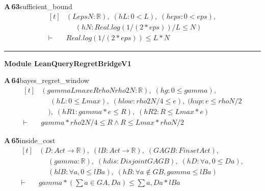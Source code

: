\documentclass[conference]{IEEEtran}
\theoremstyle{definition}
\newcommand{\lean}[1]{\textsf{\footnotesize #1}}
\begin{document}
\noindent\textbf{A\,63}\quad\lean{sufficient\_bound}
{\footnotesize\[ \begin{aligned}[t]
&(\mathit{L} \mathit{eps} \mathit{N} : \mathbb{R} ),\; (\mathit{hL} : 0 < \mathit{L}),\; (\mathit{heps} : 0 < \mathit{eps}),\\
&\quad \; (\mathit{hN} : \mathit{Real}.\mathit{log} (1/(2*\mathit{eps}))/\mathit{L} \leq \mathit{N})\\
\vdash\;&\mathit{Real}.\mathit{log} (1/(2*\mathit{eps})) \leq \mathit{L}*\mathit{N}
\end{aligned} \]}

\vspace{4pt}\noindent\rule{\columnwidth}{0.4pt}\par\vspace{2pt}
\noindent\textbf{Module \lean{LeanQueryRegretBridgeV1}}\par\vspace{3pt}

\noindent\textbf{A\,64}\quad\lean{bayes\_regret\_window}
{\footnotesize\[ \begin{aligned}[t]
&(\mathit{gamma} \mathit{Lmax} \mathit{e} \mathit{R} \mathit{rhoN} \mathit{rho2N} : \mathbb{R} ),\; (\mathit{hg} : 0 \leq \mathit{gamma}),\\
&\quad \; (\mathit{hL} : 0 \leq \mathit{Lmax}),\; (\mathit{hlow} : \mathit{rho2N} / 4 \leq \mathit{e}),\; (\mathit{hup} : \mathit{e} \leq \mathit{rhoN} / 2\\
&\quad ),\; (\mathit{hR1} : \mathit{gamma} * \mathit{e} \leq \mathit{R}),\; (\mathit{hR2} : \mathit{R} \leq \mathit{Lmax} * \mathit{e})\\
\vdash\;&\mathit{gamma} * \mathit{rho2N} / 4 \leq \mathit{R} \wedge \mathit{R} \leq \mathit{Lmax} * \mathit{rhoN} / 2
\end{aligned} \]}

\noindent\textbf{A\,65}\quad\lean{inside\_cost}
{\footnotesize\[ \begin{aligned}[t]
&(\mathit{D} : \mathit{Act} \to \mathbb{R} ),\; (\mathit{lB} : \mathit{Act} \to \mathbb{R} ),\; (\mathit{GA} \mathit{GB} : \mathit{Finset} \mathit{Act}),\\
&\quad \; (\mathit{gamma} : \mathbb{R} ),\; (\mathit{hdis} : \mathit{Disjoint} \mathit{GA} \mathit{GB}),\; (\mathit{hD} : \forall \mathit{a}, 0 \leq \mathit{D} \mathit{a}),\\
&\quad \; (\mathit{hlB} : \forall \mathit{a}, 0 \leq \mathit{lB} \mathit{a}),\; (\mathit{hB} : \forall \mathit{a} \notin \mathit{GB}, \mathit{gamma} \leq \mathit{lB} \mathit{a})\\
\vdash\;&\mathit{gamma} * (\textstyle\sum \mathit{a} \in \mathit{GA}, \mathit{D} \mathit{a}) \leq \textstyle\sum \mathit{a}, \mathit{D} \mathit{a} * \mathit{lB} \mathit{a}
\end{aligned} \]}
\end{document}
